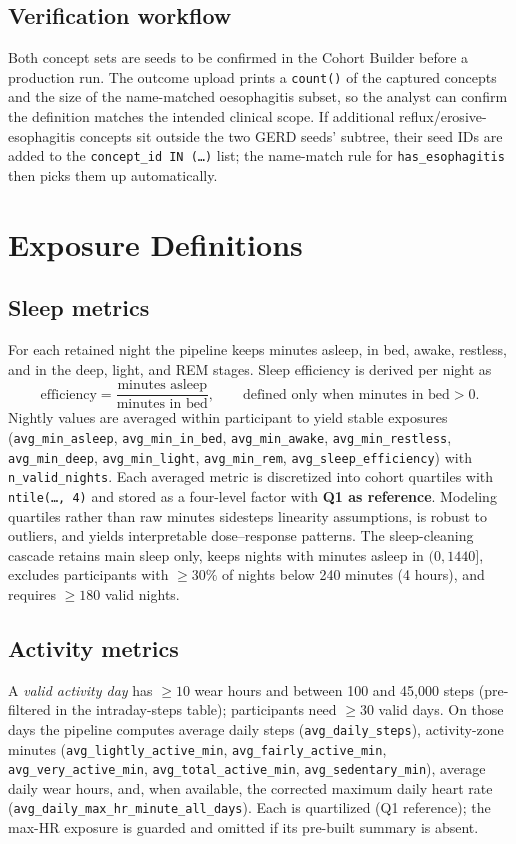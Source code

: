 \documentclass[11pt]{article}
\newcommand{\code}[1]{\texttt{\small #1}}
\begin{document}
\subsection{Verification workflow}
Both concept sets are seeds to be confirmed in the Cohort Builder before a production run. The outcome
upload prints a \code{count()} of the captured concepts and the size of the name-matched oesophagitis
subset, so the analyst can confirm the definition matches the intended clinical scope. If additional
reflux/erosive-esophagitis concepts sit outside the two GERD seeds' subtree, their seed IDs are added to
the \code{concept_id IN (\ldots)} list; the name-match rule for \code{has_esophagitis} then picks them up
automatically.

\section{Exposure Definitions}

\subsection{Sleep metrics}
For each retained night the pipeline keeps minutes asleep, in bed, awake, restless, and in the deep,
light, and REM stages. Sleep efficiency is derived per night as
\[
\text{efficiency} = \frac{\text{minutes asleep}}{\text{minutes in bed}}, \qquad
\text{defined only when minutes in bed} > 0 .
\]
Nightly values are averaged within participant to yield stable exposures (\code{avg_min_asleep},
\code{avg_min_in_bed}, \code{avg_min_awake}, \code{avg_min_restless}, \code{avg_min_deep},
\code{avg_min_light}, \code{avg_min_rem}, \code{avg_sleep_efficiency}) with \code{n_valid_nights}. Each
averaged metric is discretized into cohort quartiles with \code{ntile(\ldots, 4)} and stored as a
four-level factor with \textbf{Q1 as reference}. Modeling quartiles rather than raw minutes sidesteps
linearity assumptions, is robust to outliers, and yields interpretable dose--response patterns. The
sleep-cleaning cascade retains main sleep only, keeps nights with minutes asleep in $(0, 1440]$,
excludes participants with $\geq 30\%$ of nights below 240 minutes (4 hours), and requires
$\geq 180$ valid nights.

\subsection{Activity metrics}
A \emph{valid activity day} has $\geq 10$ wear hours and between 100 and 45{,}000 steps (pre-filtered
in the intraday-steps table); participants need $\geq 30$ valid days. On those days the pipeline
computes average daily steps (\code{avg_daily_steps}), activity-zone minutes
(\code{avg_lightly_active_min}, \code{avg_fairly_active_min}, \code{avg_very_active_min},
\code{avg_total_active_min}, \code{avg_sedentary_min}), average daily wear hours, and, when available,
the corrected maximum daily heart rate (\code{avg_daily_max_hr_minute_all_days}). Each is quartilized
(Q1 reference); the max-HR exposure is guarded and omitted if its pre-built summary is absent.
\end{document}
